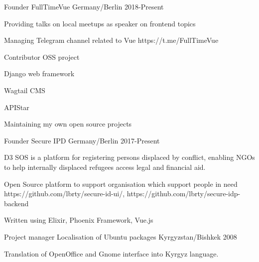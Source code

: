 \begin{cventries}
  \cventry
    {Founder}
    {FullTimeVue}
    {Germany/Berlin}
    {2018-Present}
    {
      \begin{cvitems}
        \item {Providing talks on local meetups as speaker on frontend topics}
        \item {Managing Telegram channel related to Vue https://t.me/FullTimeVue}
      \end{cvitems}
    }
  \cventry
    {Contributor}
    {OSS project}
    {}
    {}
    {
      \begin{cvitems}
        \item {Django web framework}
        \item {Wagtail CMS}
        \item {APIStar}
        \item {Maintaining my own open source projects}
      \end{cvitems}
    }
  \cventry
    {Founder}
    {Secure IPD}
    {Germany/Berlin}
    {2017-Present}
    {
      \begin{cvitems}
        \item {D3 SOS is a platform for registering persons displaced by conflict, enabling NGOs to help internally displaced refugees access legal and financial aid.}
        \item {Open Source platform to support organisation which support people in need https://github.com/lbrty/secure-id-ui/, https://github.com/lbrty/secure-idp-backend}
        \item {Written using Elixir, Phoenix Framework, Vue.js}
      \end{cvitems}
    }
  \cventry
    {Project manager}
    {Localisation of Ubuntu packages}
    {Kyrgyzstan/Bishkek}
    {2008}
    {
      \begin{cvitems}
        \item {Translation of OpenOffice and Gnome interface into Kyrgyz language.}
      \end{cvitems}
    }
\end{cventries}
